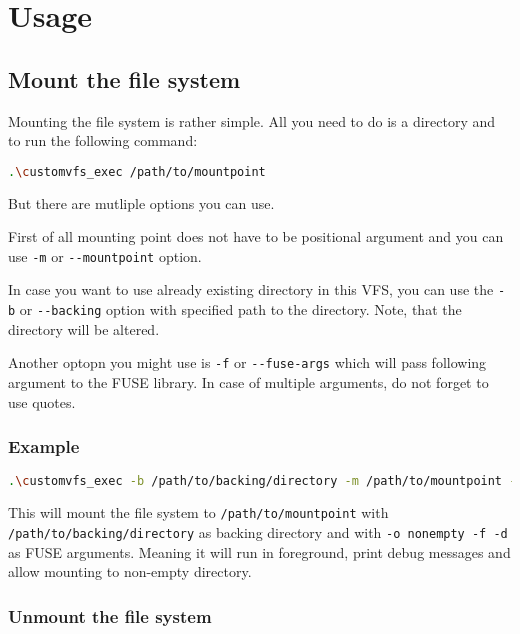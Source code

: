 \chapter{Usage}

\section*{Mount the file system}

Mounting the file system is rather simple.
All you need to do is a directory and to run the following command:

\begin{lstlisting}[language=bash, basicstyle=\ttfamily\small]
  .\customvfs_exec /path/to/mountpoint
\end{lstlisting}

But there are mutliple options you can use.

First of all mounting point does not have to be positional argument and you can use \texttt{-m} or \texttt{-{}-mountpoint} option.

In case you want to use already existing directory in this VFS, you can use the \texttt{-b} or \texttt{-{}-backing} option with specified path to the directory.
Note, that the directory will be altered.

Another optopn you might use is \texttt{-f} or \texttt{-{}-fuse-args} which will pass following argument to the FUSE library.
In case of multiple arguments, do not forget to use quotes.

\subsection*{Example}

\begin{lstlisting}[language=bash, basicstyle=\ttfamily\small]
  .\customvfs_exec -b /path/to/backing/directory -m /path/to/mountpoint -f "-o nonempty -f -d"
\end{lstlisting}

This will mount the file system to \texttt{/path/to/mountpoint} with \texttt{/path/to/backing/directory} as backing directory and with \texttt{-o nonempty -f -d} as FUSE arguments.
Meaning it will run in foreground, print debug messages and allow mounting to non-empty directory.

\subsection*{Unmount the file system}

